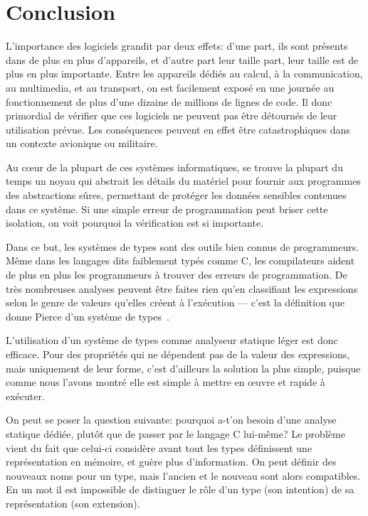
\section*{Conclusion}

L'importance des logiciels grandit par deux effets:
d'une part, ils sont présents dans de plus en plus d'appareils,
et d'autre part leur taille part, leur taille est de plus en plus importante.
Entre les appareils dédiés au calcul, à la communication, au multimedia, et au
transport, on est facilement exposé en une journée au fonctionnement de plus
d'une dizaine de millions de lignes de code.
Il donc primordial de vérifier que ces logiciels ne peuvent pas être détournés
de leur utilisation prévue. Les conséquences peuvent en effet être
catastrophiques dans un contexte avionique ou militaire.

Au cœur de la plupart de ces systèmes informatiques, se trouve la plupart du
temps un noyau qui abstrait les détails du matériel pour fournir aux programmes
des abstractions sûres, permettant de protéger les données sensibles contenues
dans ce système. Si une \linebreak simple erreur de programmation peut briser
cette isolation, on voit pourquoi la vérification est si importante.

Dans ce but, les systèmes de types sont des outils bien connus de programmeurs.
Même dans les langages dits faiblement typés comme C, les compilateurs aident de
plus en plus les programmeurs à trouver des erreurs de programmation. De très
nombreuses analyses peuvent être faites rien qu'en classifiant les expressions
selon le genre de valeurs qu'elles créent à l'exécution --- c'est la définition
que donne Pierce d'un système de types~\cite[p.~1]{TAPL}.

L'utilisation d'un système de types comme analyseur statique léger est donc
efficace. Pour des propriétés qui ne dépendent pas de la valeur des expressions,
mais uniquement de leur forme, c'est d'ailleurs la solution la plus simple,
puisque comme nous l'avons montré elle est simple à mettre en œuvre et rapide à
exécuter.

On peut se poser la question suivante: pourquoi a-t'on besoin d'une analyse
statique dédiée, plutôt que de passer par le langage C lui-même? Le problème
vient du fait que celui-ci considère avant tout les types définissent une
représentation en mémoire, et guère plus d'information. On peut définir des
nouveaux noms pour un type, mais l'ancien et le nouveau sont alors compatibles.
En un mot il est impossible de distinguer le rôle d'un type (son intention) de
sa représentation (son extension).

